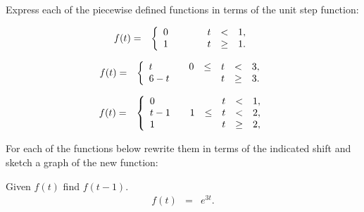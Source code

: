 \begin{problem}
\item Express each of the piecewise defined functions in terms of the
  unit step function:
  \begin{subproblem}
  \item 
    \begin{eqnarray*}
      f(t) & = & \left\{
        \begin{array}{l@{\hspace{2em}}rcccl}
          0 &    &  & t & < & 1, \\
          1 &    &  & t & \geq & 1. \\
        \end{array}
      \right.
    \end{eqnarray*}
    \vfill

  \item 
    \begin{eqnarray*}
      f(t) & = & \left\{
        \begin{array}{l@{\hspace{2em}}rcccl}
          t & 0 & \leq & t & < & 3, \\
          6-t &  &     & t & \geq & 3. \\
        \end{array}
      \right.
    \end{eqnarray*}
    \vfill

  \item 
    \begin{eqnarray*}
      f(t) & = & \left\{
        \begin{array}{l@{\hspace{2em}}rcccl}
          0   &    &  & t & < & 1, \\
          t-1 &  1 & \leq & t & < & 2, \\
          1   &    &      & t & \geq & 2, \\
        \end{array}
      \right.
    \end{eqnarray*}
    \vfill

  \end{subproblem}


  \clearpage

\item For each of the functions below rewrite them in terms of the
  indicated shift and sketch a graph of the new function:

  \begin{subproblem}
  \item Given $f(t)$ find $f(t-1)$.
    \begin{eqnarray*}
      f(t) & = & e^{3t}.
    \end{eqnarray*}
    \vfill


\end{subproblem}
\end{problem}
